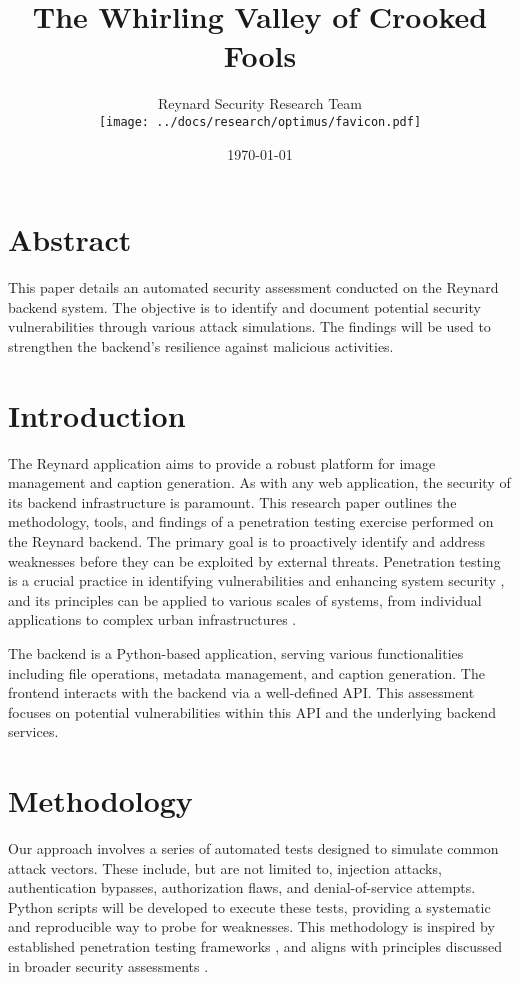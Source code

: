 \documentclass{article}
\title{The Whirling Valley of Crooked Fools}
\author{Reynard Security Research Team \\ \texttt{[image: ../docs/research/optimus/favicon.pdf]}}
\date{\today}
\begin{document}
\maketitle

\section*{Abstract}
This paper details an automated security assessment conducted on the Reynard backend system. The objective is to identify and document potential security vulnerabilities through various attack simulations. The findings will be used to strengthen the backend's resilience against malicious activities.

\section{Introduction}
The Reynard application aims to provide a robust platform for image management and caption generation. As with any web application, the security of its backend infrastructure is paramount. This research paper outlines the methodology, tools, and findings of a penetration testing exercise performed on the Reynard backend. The primary goal is to proactively identify and address weaknesses before they can be exploited by external threats. Penetration testing is a crucial practice in identifying vulnerabilities and enhancing system security \cite{Phong2014, Altulaihan2023}, and its principles can be applied to various scales of systems, from individual applications to complex urban infrastructures \cite{Conti2015}.

The backend is a Python-based application, serving various functionalities including file operations, metadata management, and caption generation. The frontend interacts with the backend via a well-defined API. This assessment focuses on potential vulnerabilities within this API and the underlying backend services.

\section{Methodology}
Our approach involves a series of automated tests designed to simulate common attack vectors. These include, but are not limited to, injection attacks, authentication bypasses, authorization flaws, and denial-of-service attempts. Python scripts will be developed to execute these tests, providing a systematic and reproducible way to probe for weaknesses. This methodology is inspired by established penetration testing frameworks \cite{Wai2001}, and aligns with principles discussed in broader security assessments \cite{Phong2014}.
\end{document}
